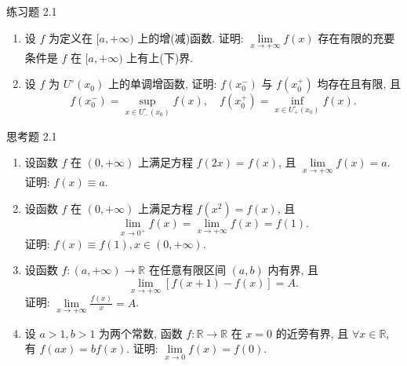 \begin{exblock}{练习题 2.1}
\begin{enumerate}[label=(\arabic*)]
  \item 设 $f$ 为定义在 $[a, +\infty)$ 上的增(减)函数. 证明: $\lim\limits_{x \to +\infty} f(x)$ 存在有限的充要条件是 $f$ 在 $[a, +\infty)$ 上有上(下)界.
  \item 设 $f$ 为 $U^{\circ}(x_{0})$ 上的单调增函数, 证明: $f(x_{0}^{-})$ 与 $f(x_{0}^{+})$ 均存在且有限, 且
  \[
  f(x_{0}^{-})=\sup_{x\in U_{-}^{\circ}(x_{0})}f(x),\quad f(x_{0}^{+})=\inf_{x\in U_{+}^{\circ}(x_{0})}f(x).
\]
\end{enumerate}
\end{exblock}

\begin{exblock}{思考题 2.1}
  \item \begin{enumerate}[label=(\arabic*)]
    \item 设函数 $f$ 在 $(0, +\infty)$ 上满足方程 $f(2x) = f(x)$, 且 $\lim\limits_{x \to +\infty} f(x) = a$. 证明: $f(x) \equiv a$.
    \item 设函数 $f$ 在 $(0, +\infty)$ 上满足方程 $f(x^{2}) = f(x)$, 且
    \[
    \lim_{x\to0^{+}}f(x)=\lim_{x\to+\infty}f(x)=f(1).
\]
    证明: $f(x) \equiv f(1), x \in (0, +\infty)$.
  \item 设函数 $f\colon (a, +\infty) \to \mathbb{R}$ 在任意有限区间 $(a, b)$ 内有界, 且
  \[
  \lim_{x\to+\infty}\left[f(x+1)-f(x)\right]=A.
\]
  证明: $\lim\limits_{x\to+\infty}\frac{f(x)}{x}=A$.
  \item 设 $a > 1, b > 1$ 为两个常数, 函数 $f\colon \mathbb{R} \to \mathbb{R}$ 在 $x = 0$ 的近旁有界, 且 $\forall x \in \mathbb{R}$, 有 $f(ax) = bf(x)$. 证明: $\lim\limits_{x \to 0} f(x) = f(0)$.
\end{enumerate}
\end{exblock}
